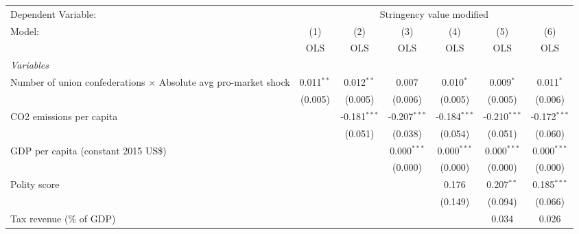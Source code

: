 
\begingroup
\centering
\begin{tabular}{lcccccc}
   \toprule
   Dependent Variable: & \multicolumn{6}{c}{Stringency value modified}\\
   Model:                                                                 & (1)          & (2)            & (3)            & (4)            & (5)            & (6)\\  
                                                                          &  OLS         & OLS            & OLS            & OLS            & OLS            & OLS\\  
   \midrule
   \emph{Variables}\\
   Number of union confederations $\times$ Absolute avg pro-market shock  & 0.011$^{**}$ & 0.012$^{**}$   & 0.007          & 0.010$^{*}$    & 0.009$^{*}$    & 0.011$^{*}$\\   
                                                                          & (0.005)      & (0.005)        & (0.006)        & (0.005)        & (0.005)        & (0.006)\\   
   CO2 emissions per capita                                               &              & -0.181$^{***}$ & -0.207$^{***}$ & -0.184$^{***}$ & -0.210$^{***}$ & -0.172$^{***}$\\   
                                                                          &              & (0.051)        & (0.038)        & (0.054)        & (0.051)        & (0.060)\\   
   GDP per capita (constant 2015 US\$)                                    &              &                & 0.000$^{***}$  & 0.000$^{***}$  & 0.000$^{***}$  & 0.000$^{***}$\\   
                                                                          &              &                & (0.000)        & (0.000)        & (0.000)        & (0.000)\\   
   Polity score                                                           &              &                &                & 0.176          & 0.207$^{**}$   & 0.185$^{***}$\\   
                                                                          &              &                &                & (0.149)        & (0.094)        & (0.066)\\   
   Tax revenue (\% of GDP)                                                &              &                &                &                & 0.034          & 0.026\\   

\end{tabular}
